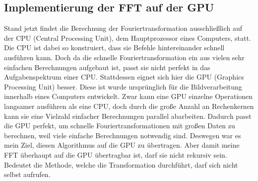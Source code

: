 \documentclass[a4paper,12pt]{article}
\theoremstyle{definition}
\theoremstyle{remark}
\begin{document}
\subsection{Implementierung der FFT auf der GPU}
Stand jetzt findet die Berechnung der Fouriertransformation ausschließlich auf der CPU (Central Processing Unit), dem Hauptprozessor eines Computers, statt.
Die CPU ist dabei so konstruiert, dass sie Befehle hintereinander schnell ausführen kann. Doch da die schnelle Fouriertransformation 
ein aus vielen sehr einfachen Berechnungen aufgebaut ist, passt sie nicht perfekt in das Aufgabenspektrum einer CPU. Stattdessen 
eignet sich hier die GPU (Graphics Processing Unit) besser. Diese ist wurde ursprünglich für die Bildverarbeitung innerhalb eines Computers entwickelt. 
Zwar kann eine GPU einzelne Operationen langsamer ausführen als eine CPU, doch durch die große Anzahl an Rechenkernen kann 
sie eine Vielzahl einfacher Berechnungen parallel abarbeiten. Dadurch passt die GPU perfekt, um schnelle Fouriertransformationen mit großen Daten 
zu berechnen, weil viele einfache Berechnungen notwendig sind. Deswegen war es mein Ziel, diesen Algorithmus auf die GPU zu 
übertragen. Aber damit meine FFT überhaupt auf die GPU übertragbar ist, darf sie nicht rekursiv sein. Bedeutet die Methode, 
welche die Transformation durchführt, darf sich nicht selbst aufrufen. 
\end{document}
